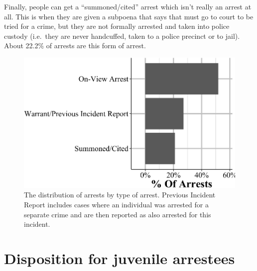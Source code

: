 \documentclass[
  12pt,
  openany]{book}
\begin{document}
Finally, people can get a ``summoned/cited'' arrest which isn't really an arrest at all. This is when they are given a subpoena that says that must go to court to be tried for a crime, but they are not formally arrested and taken into police custody (i.e.~they are never handcuffed, taken to a police precinct or to jail). About 22.2\% of arrests are this form of arrest.

\begin{figure}

{\centering \includegraphics[width=0.9\linewidth]{16_nibrs_arrestee_files/figure-latex/arresteeTypeOfArrest-1} 

}

\caption{The distribution of arrests by type of arrest. Previous Incident Report includes cases where an individual was arrested for a separate crime and are then reported as also arrested for this incident.}\label{fig:arresteeTypeOfArrest}
\end{figure}

\section{Disposition for juvenile arrestees}\label{disposition-for-juvenile-arrestees}
\end{document}
